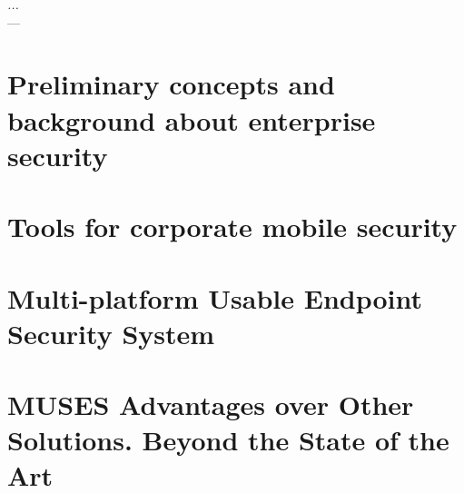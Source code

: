 \label{chap:byodSotA} 

\begin{flushright}{\slshape
   ... } \\ \medskip
    --- {}
\end{flushright}

\minitoc\mtcskip
\vfill

\section{Preliminary concepts and background about enterprise security}
\label{sec:preliminaryconcepts}


\section{Tools for corporate mobile security}
\label{sec:toolsreview}

\section{Multi-platform Usable Endpoint Security System}
\label{sec:muses}

\section{MUSES Advantages over Other Solutions. Beyond the State of the Art}
\label{sec:comparison}
